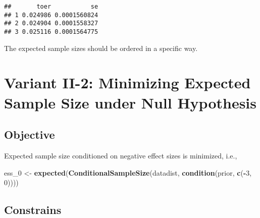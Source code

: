 \documentclass[]{book}
\newenvironment{Shaded}{\begin{snugshade}}{\end{snugshade}}
\newcommand{\DecValTok}[1]{\textcolor[rgb]{0.00,0.00,0.81}{#1}}
\newcommand{\KeywordTok}[1]{\textcolor[rgb]{0.13,0.29,0.53}{\textbf{#1}}}
\newcommand{\NormalTok}[1]{#1}
\newcommand{\OperatorTok}[1]{\textcolor[rgb]{0.81,0.36,0.00}{\textbf{#1}}}
\newcommand{\StringTok}[1]{\textcolor[rgb]{0.31,0.60,0.02}{#1}}
\begin{document}
\begin{verbatim}
##       toer           se
## 1 0.024986 0.0001560824
## 2 0.024904 0.0001558327
## 3 0.025116 0.0001564775
\end{verbatim}

The expected sample sizes should be ordered in a specific way.

\begin{Shaded}
\end{Shaded}

\hypertarget{variantII_2}{%
\section{Variant II-2: Minimizing Expected Sample Size under Null Hypothesis}\label{variantII_2}}

\hypertarget{objective-4}{%
\subsection{Objective}\label{objective-4}}

Expected sample size conditioned on negative effect sizes is minimized, i.e.,

\begin{Shaded}
\begin{Highlighting}[]
\NormalTok{ess_}\DecValTok{0}\NormalTok{ <-}\StringTok{ }\KeywordTok{expected}\NormalTok{(}\KeywordTok{ConditionalSampleSize}\NormalTok{(datadist, }\KeywordTok{condition}\NormalTok{(prior, }\KeywordTok{c}\NormalTok{(}\OperatorTok{-}\DecValTok{3}\NormalTok{, }\DecValTok{0}\NormalTok{))))}
\end{Highlighting}
\end{Shaded}

\hypertarget{constrains-4}{%
\subsection{Constrains}\label{constrains-4}}
\end{document}
